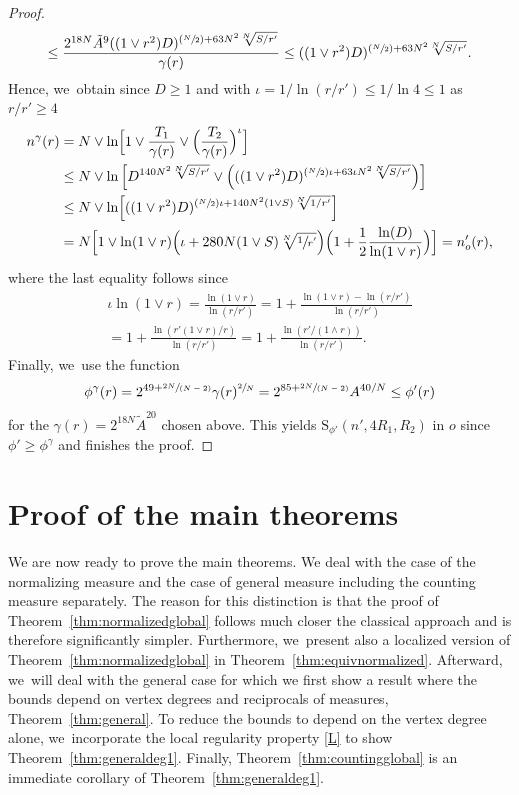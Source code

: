 \documentclass[JEP,XML,SOM,Unicode,published]{cedram}
\newcommand{\Psfrac}[2]{(\sfrac{#1}{#2})}
\newcommand{\spfrac}[2]{\sfrac{#1}{(#2)}}
\newcommand{\rS}{\mathrm{S}}
\theoremstyle{plain}
\theoremstyle{definition}
\begin{document}
\begin{proof}
\[\leq
\frac{2^{18 N}\tilde A^9((1\vee r^2) D)^{\Psfrac{N}{2}+{63 N^2\sqrt[ N]{S/r'}}}}{\gamma(r)}
\leq ((1\vee r^2) D)^{\Psfrac{N}{2}+{63 N^2\sqrt[ N]{S/r'}}}.
\]
Hence, we~obtain since $ D\geq 1$ and with $ \iota=1/\ln(r/r') \le 1/\ln {4}\le {1}$ as $ r/r' \ge {4}$
\begin{align*}
n^\gamma(r)&=
N\vee \ln\Bigl[1\vee
\frac{T_1}{\gamma(r)}\vee \Bigl(\frac{T_2}{\gamma(r)}\Bigr)^{\iota}
\Bigr]
\\
&\leq
N\vee \ln \left[ D^{140 N^2\sqrt[ N]{S/r'}}\vee \left(((1\vee r^2) D)^{\Psfrac{N}{2}\iota+{63\iota N^2\sqrt[ N]{S/r'}}}\right)\right]
\\
&\leq
N\vee \ln \Bigl[ ((1\vee r^2) D)^{\Psfrac{N}{2}\iota+{140 N^2(1\vee S)\sqrt[ N]{1/r'}}}\Bigr]
\\
&=
N\Bigl[1\vee \ln (1\vee r)\Bigl({{\iota}+{280 N(1\vee S)\sqrt[ N]{\sfrac {1}{r'}}}}\Bigr) \Bigl( 1+ \frac{1}{2}\frac{\ln ( D)}{\ln (1\vee r)}\Bigr)
\Bigr]=n_o'(r),
\end{align*}
where the last equality follows since
\begin{multline*} \iota \ln (1\vee r)= \frac{\ln (1\vee r)}{\ln (r/r')} =1 + \frac{\ln (1\vee r) -\ln (r/r') }{\ln (r/r')}
\\
=1 + \frac{\ln(r'(1\vee r)/r)}{\ln(r/r')} =1 + \frac{\ln(r'/(1\wedge r))}{\ln(r/r')}.
\end{multline*}
Finally, we~{use} the function
\[
\phi^{\gamma}(r) =2^{49+\spfrac{2 N}{N-2}}\gamma(r)^{\sfrac{2}{N}}=2^{85+\spfrac{2 N}{N-2}} A^{40/ N}\leq \phi'(r)
\]
for the $ \gamma(r)= 2^{18 N}\tilde A^{{20}}$ chosen above.
This yields $\rS_{\phi'}( n', 4R_1,R_2)$ in $o$ since $ \phi'\ge \phi^{\gamma} $ and finishes the proof.
\end{proof}

\section{Proof of the main theorems}\label{section:remaining}

We are now ready to prove the main theorems. {We deal with the case of the normalizing measure and the case of general measure including the counting measure separately.
The reason for this distinction is that the proof of Theorem~\ref{thm:normalizedglobal} follows much closer the classical approach and is therefore significantly simpler. Furthermore, we~present also a localized version of Theorem~\ref{thm:normalizedglobal} in Theorem~\ref{thm:equivnormalized}.
}
Afterward, we~will deal with the general case for which we first show a result where the bounds depend on vertex degrees and reciprocals of measures, Theorem~\ref{thm:general}. To reduce the bounds to depend on the vertex degree alone, we~incorporate the local regularity property \eqref{L} to show Theorem~\ref{thm:generaldeg1}. Finally, Theorem~\ref{thm:countingglobal} is an immediate corollary of Theorem~\ref{thm:generaldeg1}.
\end{document}
